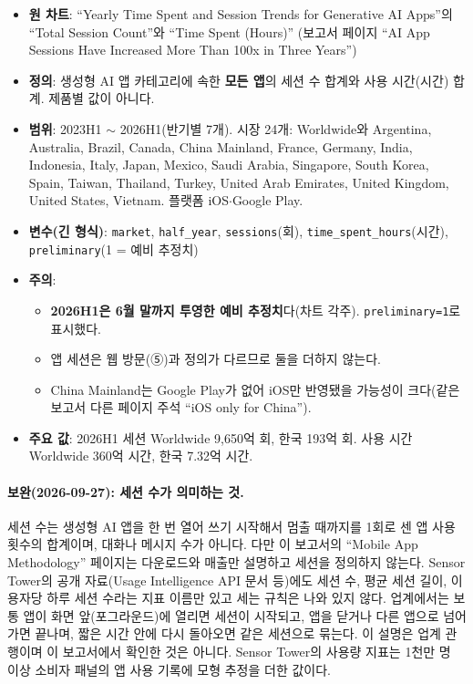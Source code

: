 \documentclass[11pt]{article}
\begin{document}
\begin{itemize}
  \item \textbf{원 차트}: ``Yearly Time Spent and Session Trends for Generative AI Apps''의 ``Total Session Count''와 ``Time Spent (Hours)'' (보고서 페이지 ``AI App Sessions Have Increased More Than 100x in Three Years'')
  \item \textbf{정의}: 생성형 AI 앱 카테고리에 속한 \textbf{모든 앱}의 세션 수 합계와 사용 시간(시간) 합계. 제품별 값이 아니다.
  \item \textbf{범위}: 2023H1 $\sim$ 2026H1(반기별 7개). 시장 24개: Worldwide와 Argentina, Australia, Brazil, Canada, China Mainland, France, Germany, India, Indonesia, Italy, Japan, Mexico, Saudi Arabia, Singapore, South Korea, Spain, Taiwan, Thailand, Turkey, United Arab Emirates, United Kingdom, United States, Vietnam. 플랫폼 iOS$\cdot$Google Play.
  \item \textbf{변수(긴 형식)}: \texttt{market}, \texttt{half\_year}, \texttt{sessions}(회), \texttt{time\_spent\_hours}(시간), \texttt{preliminary}(1 = 예비 추정치)
  \item \textbf{주의}:
  \begin{itemize}
    \item \textbf{2026H1은 6월 말까지 투영한 예비 추정치}다(차트 각주). \texttt{preliminary=1}로 표시했다.
    \item 앱 세션은 웹 방문(⑤)과 정의가 다르므로 둘을 더하지 않는다.
    \item China Mainland는 Google Play가 없어 iOS만 반영됐을 가능성이 크다(같은 보고서 다른 페이지 주석 ``iOS only for China'').
  \end{itemize}
  \item \textbf{주요 값}: 2026H1 세션 Worldwide 9,650억 회, 한국 193억 회. 사용 시간 Worldwide 360억 시간, 한국 7.32억 시간.
\end{itemize}

\paragraph{보완(2026-09-27): 세션 수가 의미하는 것.} 세션 수는 생성형 AI 앱을 한 번 열어 쓰기 시작해서 멈출 때까지를 1회로 센 앱 사용 횟수의 합계이며, 대화나 메시지 수가 아니다. 다만 이 보고서의 ``Mobile App Methodology'' 페이지는 다운로드와 매출만 설명하고 세션을 정의하지 않는다. Sensor Tower의 공개 자료(Usage Intelligence API 문서 등)에도 세션 수, 평균 세션 길이, 이용자당 하루 세션 수라는 지표 이름만 있고 세는 규칙은 나와 있지 않다. 업계에서는 보통 앱이 화면 앞(포그라운드)에 열리면 세션이 시작되고, 앱을 닫거나 다른 앱으로 넘어가면 끝나며, 짧은 시간 안에 다시 돌아오면 같은 세션으로 묶는다. 이 설명은 업계 관행이며 이 보고서에서 확인한 것은 아니다. Sensor Tower의 사용량 지표는 1천만 명 이상 소비자 패널의 앱 사용 기록에 모형 추정을 더한 값이다.
\end{document}
